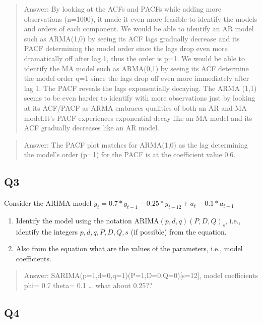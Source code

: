 \documentclass[
]{article}
\begin{document}
\begin{quote}
Answer: By looking at the ACFs and PACFs while adding more observations
(n=1000), it made it even more feasible to identify the models and
orders of each component. We would be able to identify an AR model such
as ARMA(1,0) by seeing its ACF lags gradually decrease and its PACF
determining the model order since the lags drop even more dramatically
off after lag 1, thus the order is p=1. We would be able to identify the
MA model such as ARMA(0,1) by seeing its ACF determine the model order
q=1 since the lags drop off even more immediately after lag 1. The PACF
reveals the lags exponentially decaying. The ARMA (1,1) seems to be even
harder to identify with more observations just by looking at its
ACF/PACF as ARMA embraces qualities of both an AR and MA model.It's PACF
experiences exponential decay like an MA model and its ACF gradually
decreases like an AR model.
\end{quote}

\begin{quote}
Answer: The PACF plot matches for ARMA(1,0) as the lag determining the
model's order (p=1) for the PACF is at the coefficient value 0.6.
\end{quote}

\hypertarget{q3}{%
\subsection{Q3}\label{q3}}

Consider the ARIMA model
\(y_t=0.7*y_{t-1}-0.25*y_{t-12}+a_t-0.1*a_{t-1}\)

\begin{enumerate}[label=(\alph*)]

\item Identify the model using the notation ARIMA$(p,d,q)(P,D,Q)_ s$, i.e., identify the integers $p,d,q,P,D,Q,s$ (if possible) from the equation.

\item Also from the equation  what are the values of the parameters, i.e., model coefficients. 

\end{enumerate}

\begin{quote}
Answer: SARIMA(p=1,d=0,q=1)(P=1,D=0,Q=0){[}s=12{]}, model coefficients
phi= 0.7 theta= 0.1 \ldots{} what about 0.25??
\end{quote}

\hypertarget{q4}{%
\subsection{Q4}\label{q4}}
\end{document}
